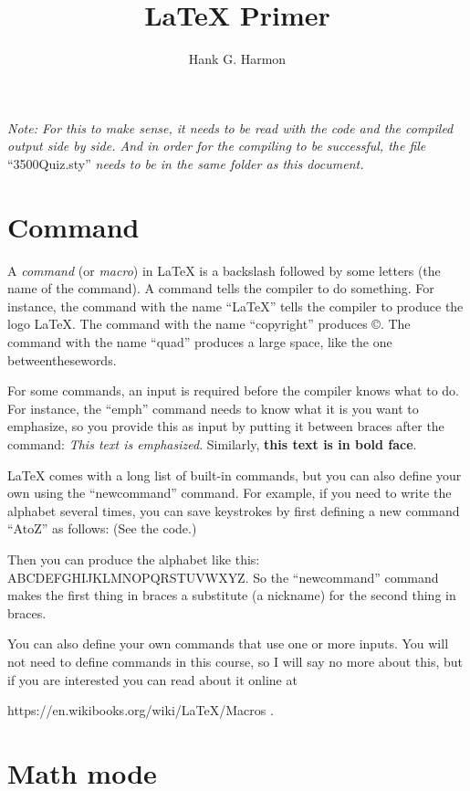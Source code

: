 \documentclass{article}
\title{{\LaTeX} Primer}
\author{Hank G. Harmon}
\begin{document}
\maketitle

\emph{Note: For this to make sense, it needs to be read with the code and the compiled output side by side. And in order for the
compiling to be successful, the file} ``3500Quiz.sty'' \emph{needs to be in the same folder as this document.}



\section{Command}

A \emph{command} (or \emph{macro}) in {\LaTeX} is a backslash followed by some letters (the name of the command).  A command tells
the compiler to do something.  For instance, the command with the name ``LaTeX'' tells the compiler to produce the logo \LaTeX.
The command with the name ``copyright'' produces \copyright.  The command with the name ``quad'' produces a large space, like the one
between\quad these\quad words.

For some commands, an input is required before the compiler knows what to do.  For instance, the ``emph'' command needs to know what
it is you want to emphasize, so you provide this as input by putting it between braces after the command: \emph{This text is
emphasized}.  Similarly, \textbf{this text is in bold face}.

{\LaTeX} comes with a long list of built-in commands, but you can also define your own using the ``newcommand'' command.  For
example, if you need to write the alphabet several times, you can save keystrokes by first defining a new command ``AtoZ'' as
follows: (See the code.)

\newcommand{\AtoZ}{ABCDEFGHIJKLMNOPQRSTUVWXYZ}

Then you can produce the alphabet like this: \AtoZ.  So the ``newcommand'' command makes the first thing in braces a substitute (a
nickname) for the second thing in braces.

You can also define your own commands that use one or more inputs.  You will not need to define commands in this course, so I will
say no more about this, but if you are interested you can read about it online at

https://en.wikibooks.org/wiki/LaTeX/Macros .

\section{Math mode}
\end{document}
